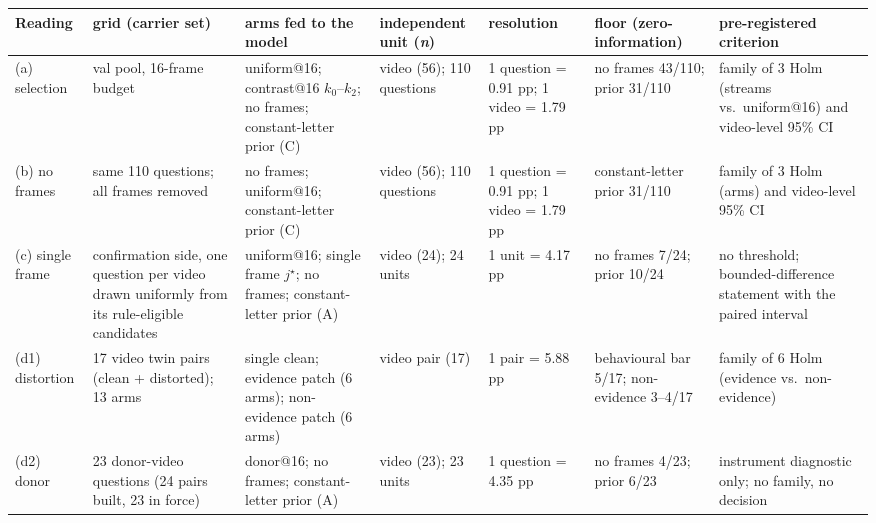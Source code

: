 {\footnotesize
\begin{tabular}{@{}l p{1.02in} p{1.30in} p{0.92in} p{0.92in} p{0.92in} p{0.90in}@{}}
\toprule
Reading & grid (carrier set) & arms fed to the model & independent unit (\textit{n}) & resolution & floor (zero-information) & pre-registered criterion \\
\midrule
(a) selection & val pool, 16-frame budget & uniform@16; contrast@16 $k_0$--$k_2$; no frames; constant-letter prior (C) & video (56); 110 questions & 1 question = 0.91 pp; 1 video = 1.79 pp & no frames 43/110; prior 31/110 & family of 3 Holm (streams vs.\ uniform@16) and video-level 95\% CI \\
(b) no frames & same 110 questions; all frames removed & no frames; uniform@16; constant-letter prior (C) & video (56); 110 questions & 1 question = 0.91 pp; 1 video = 1.79 pp & constant-letter prior 31/110 & family of 3 Holm (arms) and video-level 95\% CI \\
(c) single frame & confirmation side, one question per video drawn uniformly from its rule-eligible candidates & uniform@16; single frame $j^\star$; no frames; constant-letter prior (A) & video (24); 24 units & 1 unit = 4.17 pp & no frames 7/24; prior 10/24 & no threshold; bounded-difference statement with the paired interval \\
(d1) distortion & 17 video twin pairs (clean + distorted); 13 arms & single clean; evidence patch (6 arms); non-evidence patch (6 arms) & video pair (17) & 1 pair = 5.88 pp & behavioural bar 5/17; non-evidence 3--4/17 & family of 6 Holm (evidence vs.\ non-evidence) \\
(d2) donor & 23 donor-video questions (24 pairs built, 23 in force) & donor@16; no frames; constant-letter prior (A) & video (23); 23 units & 1 question = 4.35 pp & no frames 4/23; prior 6/23 & instrument diagnostic only; no family, no decision \\
\bottomrule
\end{tabular}
}
